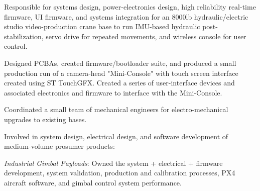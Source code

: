 \documentclass[letterpaper]{deedy-resume} %
\begin{document}
\begin{minipage}[t]{0.66\textwidth} %


\sectionspace %


\begin{tightitemize}

\item
Responsible for systems design, power-electronics design, high reliability real-time firmware, UI firmware, and systems integration for an 8000lb hydraulic/electric studio video-production crane base to run IMU-based hydraulic post-stabilization, servo drive for repeated movements, and wireless console for user control.

\item 
Designed PCBAs, created firmware/bootloader suite, and produced a small production run of a camera-head "Mini-Console" with touch screen interface created using ST TouchGFX.  Created a series of user-interface devices and associated electronics and firmware to interface with the Mini-Console.

\item Coordinated a small team of mechanical engineers for electro-mechanical upgrades to existing bases.

\end{tightitemize}
\vspace{\topsep} %

\begin{tightitemize}
\item 
Involved in system design, electrical design, and software development of medium-volume prosumer products:

\item \textit{Industrial Gimbal Payloads}: Owned the system + electrical + firmware development, system validation, production and calibration processes, PX4 aircraft software, and gimbal control system performance.


\end{tightitemize}
\end{minipage}
\end{document}
